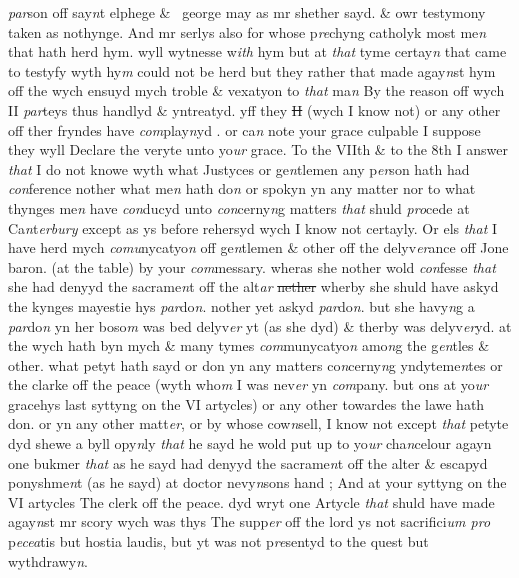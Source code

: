 \documentclass[12pt, a4paper]{book}
\begin{document}
                  \textit{par}son off say\textit{n}t elphege
			 \&  george may as mr shether sayd. \& owr testymony taken as nothynge. And mr serlys also for whose p\textit{re}chyng catholyk most me\textit{n} that hath herd hym. wyll wytnesse w\textit{ith} hym but at \textit{that} tyme certay\textit{n} that came to testyfy wyth hy\textit{m} could not be herd but they rather that made agay\textit{n}st hym off the wych ensuyd mych troble \& vexatyon to \textit{that} ma\textit{n} By the reason off wych II \textit{par}teys thus handlyd \& yntreatyd. yff they \sout{II} (wych I know not) or any other off ther fryndes have \textit{com}play\textit{n}yd . or ca\textit{n} note your grace culpable I suppose they wyll Declare the veryte unto yo\textit{ur} grace.   
				\marginpar[\vspace{0.5cm}{\textcolor{Gray}{7.8.9.}}]{}
			 To the VIIth \& to the 8th I answer \textit{that} I do not knowe wyth what Justyces or ge\textit{n}tlemen any p\textit{er}son hath had \textit{con}ference nother what me\textit{n} hath do\textit{n} or spokyn yn any matter nor to what thynges me\textit{n} have \textit{con}ducyd unto \textit{con}cerny\textit{n}g matters \textit{that} shuld \textit{pro}cede at Ca\textit{n}t\textit{erbury} except as ys before rehersyd wych I know not certayly. Or els \textit{that} I have herd mych \textit{comu}nycatyo\textit{n} off ge\textit{n}tlemen \& other off the delyv\textit{er}ance off Jone baron. (at the  table) by your \textit{com}messary. wheras she nother wold \textit{con}fesse \textit{that} she had denyyd the sacrame\textit{n}t off the alt\textit{ar}
               \sout{nether }wherby she shuld have askyd the kynges mayestie hys \textit{par}do\textit{n}. nother yet askyd \textit{par}do\textit{n}. but she havy\textit{n}g a \textit{par}do\textit{n} yn her boso\textit{m} was bed delyv\textit{er} yt (as she dyd) \& therby was delyv\textit{er}yd. at the wych hath byn mych \& many tymes \textit{com}munycatyo\textit{n} amo\textit{n}g the g\textit{en}tles \& other.  
				\marginpar[\vspace{0.5cm}{\textcolor{Gray}{10}}]{}
			 what petyt hath sayd or don yn any matters co\textit{n}cerny\textit{n}g yndyteme\textit{n}tes or the clarke off the peace (wyth who\textit{m} I was nev\textit{er} yn \textit{com}pany. but ons at yo\textit{ur} gracehys last syttyng on the VI artycles) or any other towardes the lawe hath don. or yn any other matt\textit{er}, or by whose cow\textit{n}sell, I know not except \textit{that} petyte dyd shewe a byll opy\textit{n}ly \textit{that} he sayd he wold put up to yo\textit{ur} cha\textit{n}celour agayn one bukmer \textit{that} as he sayd had denyyd the sacrame\textit{n}t off the alter \& escapyd ponyshme\textit{n}t (as he sayd) at doctor nevy\textit{n}sons hand ; And at your syttyng on  the VI artycles The clerk off the peace. dyd wryt one Artycle \textit{that}  shuld have made agay\textit{n}st mr scory wych was thys The supp\textit{er} off the lord ys not sacrifici\textit{um pro} p\textit{ecea}tis but hostia laudis, but yt was not p\textit{re}sentyd to the quest but wythdrawy\textit{n}.  
\end{document}
